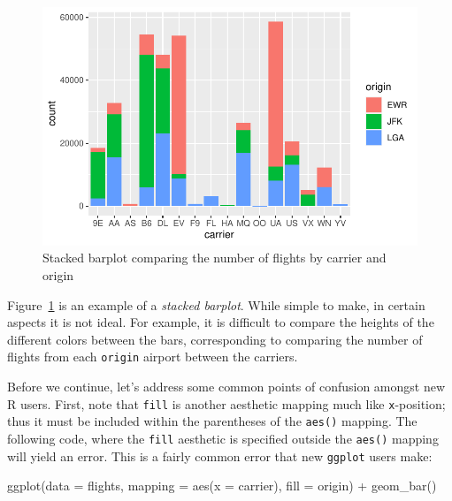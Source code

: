 \documentclass[
  letterpaper,
  DIV=11,
  numbers=noendperiod]{scrreprt}
\newenvironment{Shaded}{\begin{snugshade}}{\end{snugshade}}
\newcommand{\AttributeTok}[1]{\textcolor[rgb]{0.40,0.45,0.13}{#1}}
\newcommand{\FunctionTok}[1]{\textcolor[rgb]{0.28,0.35,0.67}{#1}}
\newcommand{\NormalTok}[1]{\textcolor[rgb]{0.00,0.23,0.31}{#1}}
\newcommand{\SpecialCharTok}[1]{\textcolor[rgb]{0.37,0.37,0.37}{#1}}
\theoremstyle{definition}
\theoremstyle{remark}
\begin{document}
\begin{figure}[H]

{\centering \includegraphics{02-visualization_files/figure-pdf/fig-flights-stacked-bar-1.pdf}

}

\caption{\label{fig-flights-stacked-bar}Stacked barplot comparing the
number of flights by carrier and origin}

\end{figure}

Figure~\ref{fig-flights-stacked-bar} is an example of a \emph{stacked
barplot}. While simple to make, in certain aspects it is not ideal. For
example, it is difficult to compare the heights of the different colors
between the bars, corresponding to comparing the number of flights from
each \texttt{origin} airport between the carriers.

Before we continue, let's address some common points of confusion
amongst new R users. First, note that \texttt{fill} is another aesthetic
mapping much like \texttt{x}-position; thus it must be included within
the parentheses of the \texttt{aes()} mapping. The following code, where
the \texttt{fill} aesthetic is specified outside the \texttt{aes()}
mapping will yield an error. This is a fairly common error that new
\texttt{ggplot} users make:

\begin{Shaded}
\begin{Highlighting}[]
\FunctionTok{ggplot}\NormalTok{(}\AttributeTok{data =}\NormalTok{ flights, }\AttributeTok{mapping =} \FunctionTok{aes}\NormalTok{(}\AttributeTok{x =}\NormalTok{ carrier), }\AttributeTok{fill =}\NormalTok{ origin) }\SpecialCharTok{+}
  \FunctionTok{geom\_bar}\NormalTok{()}
\end{Highlighting}
\end{Shaded}
\end{document}

